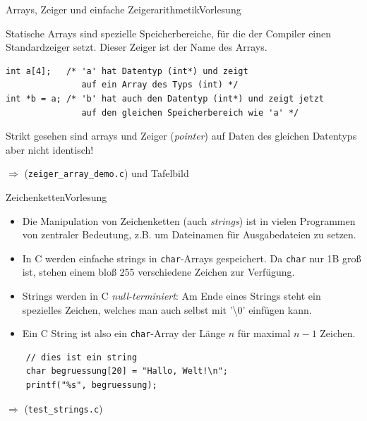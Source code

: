 \documentclass[xcolor=dvipsnames]{beamer}
\newcounter{lecturecounter}
\begin{document}
\begin{frame}[fragile]{Arrays, Zeiger und einfache Zeigerarithmetik}{Vorlesung }
  \begin{block}{}
    Statische Arrays sind spezielle Speicherbereiche, für die der Compiler einen Standardzeiger setzt. Dieser Zeiger ist der Name des Arrays.
  \end{block}
\begin{lstlisting}
int a[4];   /* 'a' hat Datentyp (int*) und zeigt  
               auf ein Array des Typs (int) */
int *b = a; /* 'b' hat auch den Datentyp (int*) und zeigt jetzt
               auf den gleichen Speicherbereich wie 'a' */
\end{lstlisting}
\begin{block}{}
  Strikt gesehen sind arrays und Zeiger (\emph{pointer}) auf Daten des gleichen Datentyps aber nicht identisch!
\end{block}
 $\Rightarrow$ (\texttt{zeiger\_array\_demo.c}) und Tafelbild

\end{frame}

\begin{frame}[fragile]{Zeichenketten}{Vorlesung }
  \begin{block}{}
    \begin{itemize}
      \item{Die Manipulation von Zeichenketten (auch \emph{strings}) ist in vielen Programmen von zentraler Bedeutung, z.B. um Dateinamen für Ausgabedateien zu setzen.}
      \item{In C werden einfache strings in \texttt{char}-Arrays gespeichert. Da \texttt{char} nur 1B groß ist, stehen einem bloß 255 verschiedene Zeichen zur Verfügung.}
      \item{Strings werden in C \emph{null-terminiert}: Am Ende eines Strings steht ein spezielles Zeichen, welches man auch selbst mit '\textbackslash 0' einfügen kann.}
      \item{Ein C String ist also ein \texttt{char}-Array der Länge $n$ für maximal $n-1$ Zeichen.}
    \end{itemize}
  \end{block}
  \begin{lstlisting}
    // dies ist ein string
    char begruessung[20] = "Hallo, Welt!\n";
    printf("%s", begruessung);
  \end{lstlisting}
  $\Rightarrow$ (\verb|test_strings.c|)
\end{frame}
\end{document}
